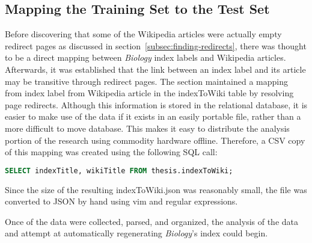 \subsection{Mapping the Training Set to the Test Set}
\label{sec:indexToWiki}

Before discovering that some of the Wikipedia articles were actually empty redirect pages as discussed in section~\ref{subsec:finding-redirects}, there was thought to be a direct mapping between {\it Biology} index labels and Wikipedia articles.
Afterwards, it was established that the link between an index label and its article may be transitive through redirect pages.
The section maintained a mapping from index label from Wikipedia article in the indexToWiki table by resolving page redirects.
Although this information is stored in the relational database, it is easier to make use of the data if it exists in an easily portable file, rather than a more difficult to move database.
This makes it easy to distribute the analysis portion of the research using commodity hardware offline.
Therefore, a CSV copy of this mapping was created using the following SQL call:
\begin{lstlisting}[language=SQL]
SELECT indexTitle, wikiTitle FROM thesis.indexToWiki;
\end{lstlisting}
\noindent Since the size of the resulting indexToWiki.json was reasonably small, the file was converted to JSON by hand using vim and regular expressions.

Once of the data were collected, parsed, and organized, the analysis of the data and attempt at automatically regenerating {\it Biology}'s index could begin.
